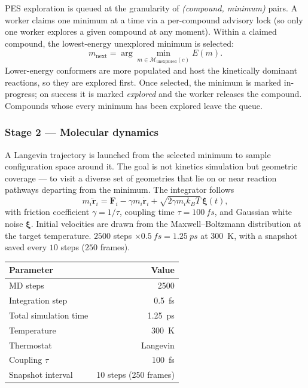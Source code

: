 PES exploration is queued at the granularity of \emph{(compound, minimum)} pairs. A worker claims one minimum at a time via a per-compound advisory lock (so only one worker explores a given compound at any moment). Within a claimed compound, the lowest-energy unexplored minimum is selected:
\begin{equation}
    m_\text{next} = \arg\min_{m \in \mathcal{M}_\text{unexplored}(c)} E(m).
\end{equation}
Lower-energy conformers are more populated and host the kinetically dominant reactions, so they are explored first. Once selected, the minimum is marked in-progress; on success it is marked \emph{explored} and the worker releases the compound. Compounds whose every minimum has been explored leave the queue.


\subsubsection{Stage 2 --- Molecular dynamics}
\label{sec:pes-md}

A Langevin trajectory is launched from the selected minimum to sample configuration space around it. The goal is not kinetics simulation but geometric coverage --- to visit a diverse set of geometries that lie on or near reaction pathways departing from the minimum. The integrator follows
\begin{equation}
    m_i \ddot{\mathbf{r}}_i = \mathbf{F}_i - \gamma m_i \dot{\mathbf{r}}_i + \sqrt{2 \gamma m_i k_B T}\, \boldsymbol{\xi}(t),
\end{equation}
with friction coefficient $\gamma = 1/\tau$, coupling time $\tau = \SI{100}{fs}$, and Gaussian white noise $\boldsymbol{\xi}$. Initial velocities are drawn from the Maxwell--Boltzmann distribution at the target temperature. $2500$ steps $\times \SI{0.5}{fs} = \SI{1.25}{ps}$ at \SI{300}{K}, with a snapshot saved every $10$ steps ($250$ frames).

\noindent\begin{tabular}{lr}
\toprule
Parameter & Value \\
\midrule
MD steps & 2500 \\
Integration step & \SI{0.5}{fs} \\
Total simulation time & \SI{1.25}{ps} \\
Temperature & \SI{300}{K} \\
Thermostat & Langevin \\
Coupling $\tau$ & \SI{100}{fs} \\
Snapshot interval & 10 steps (250 frames) \\
\bottomrule
\end{tabular}

